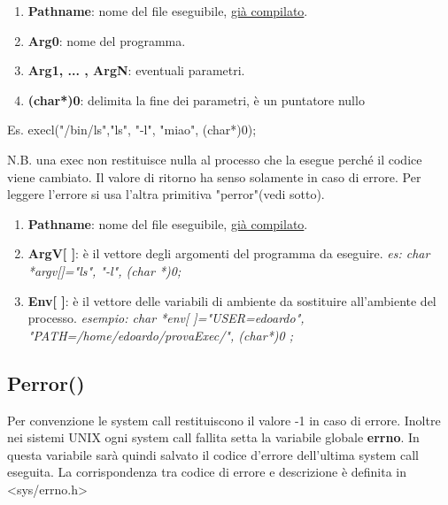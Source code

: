 \documentclass{article}
\begin{document}
\noindent{}
\medskip

\begin{enumerate}
    \item  \textbf{Pathname}: nome del file eseguibile, 
    \underline{già compilato}.
    \item \textbf{Arg0}: nome del programma.
    \item \textbf{Arg1, ... , ArgN}: eventuali parametri.
    \item \textbf{(char*)0}: delimita la fine dei parametri,
    è un puntatore nullo
\end{enumerate}

\noindent Es. execl("/bin/ls","ls", "-l", "miao", (char*)0);

\noindent N.B. una exec non restituisce nulla al processo
che la esegue perché il codice viene cambiato. Il valore di ritorno
ha senso solamente in caso di errore. Per leggere l'errore si usa
l'altra primitiva "perror"(vedi sotto).
\medskip

\noindent{}
\medskip

\begin{enumerate}
    \item  \textbf{Pathname}: nome del file eseguibile, 
    \underline{già compilato}.
    \item \textbf{ArgV[ ]}: è il vettore degli argomenti
    del programma da eseguire. 
    \textit{es: char *argv[]={"ls", "-l", (char *)0};}
    \item \textbf{Env[ ]}: è il vettore delle variabili 
    di ambiente da sostituire all'ambiente del processo.
    \textit{esempio: 
    char *env[ ]={"USER=edoardo",
     "PATH=/home/edoardo/provaExec/", (char*)0 };}
\end{enumerate}

\subsection{Perror()}
\noindent Per convenzione le system call restituiscono 
il valore -1 in caso di errore. Inoltre nei sistemi UNIX ogni 
system call fallita setta la variabile globale \textbf{errno}.
In questa variabile sarà quindi salvato il codice d'errore 
dell'ultima system call eseguita. La corrispondenza tra codice 
di errore e descrizione è definita in <sys/errno.h>
\end{document}
